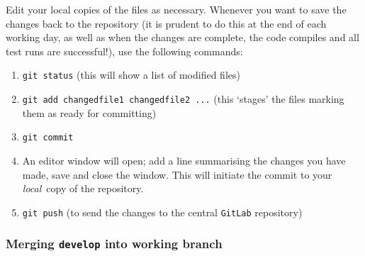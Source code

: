 Edit your local copies of the files as necessary. Whenever you want to save
the changes back to the repository (it is prudent to do this at the end of
each working day, as well as when the changes are complete, the code compiles
and all test runs are successful!), use the following commands:
\begin{enumerate}

\item \texttt{git status}  (this will show a list of modified files)

\item \texttt{git add changedfile1 changedfile2 ...}  (this `stages' the files
  marking them as ready for committing)

\item \texttt{git commit}

\item An editor window will open; add a line summarising the changes you have
  made, save and close the window. This will initiate the commit to your
  \textit{local}\ copy of the repository.

\item \texttt{git push}  (to send the changes to the central \texttt{GitLab}
  repository)

\end{enumerate}

\subsubsection{Merging \texttt{develop} into working branch}

